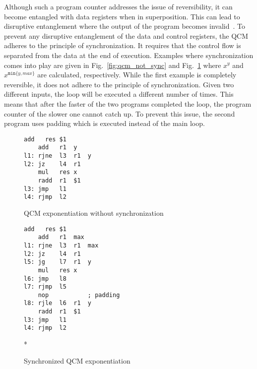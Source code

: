 Although such a program counter addresses the issue of reversibility, it can become entangled with data registers when in superposition. This can lead to disruptive entanglement where the output of the program becomes invalid~\cite{YVC24}. To prevent any disruptive entanglement of the data and control registers, the QCM adheres to the principle of synchronization. 
It requires that the control flow is separated from the data at the end of execution. 
Examples where synchronization comes into play are given in Fig.~\ref{fig:qcm_not_sync} and Fig.~\ref{fig:qcm_sync} where $x^y$ and $x^{\texttt{min}\{y, max\}}$ are calculated, respectively. 
While the first example is completely reversible, it does not adhere to the principle of synchronization. Given two different inputs, the loop will be executed a different number of times. This means that after the faster of the two programs completed the loop, the program counter of the slower one cannot catch up. To prevent this issue, the second program uses padding which is executed instead of the main loop. 

\begin{figure}[htp]
    \centering     
    \begin{minipage}{.40\textwidth}
        \vspace{7.5em}
        \begin{lstlisting}[linewidth=17em,style=QCM]
    add   res $1
    add   r1  y
l1: rjne  l3  r1  y
l2: jz    l4  r1
    mul   res x
    radd  r1  $1
l3: jmp   l1  
l4: rjmp  l2      
        \end{lstlisting}
        \caption{QCM exponentiation without synchronization}
        \label{fig:qcm_not_sync}
    \end{minipage}
    \hfill
    \begin{minipage}{.55\textwidth}
        \begin{lstlisting}[linewidth=23em,style=QCM]
    add   res $1
    add   r1  max
l1: rjne  l3  r1  max
l2: jz    l4  r1
l5: jg    l7  r1  y   
    mul   res x
l6: jmp   l8  
l7: rjmp  l5
    nop           ; padding
l8: rjle  l6  r1  y
    radd  r1  $1
l3: jmp   l1
l4: rjmp  l2
        \end{lstlisting}*
        \caption{Synchronized QCM exponentiation}    
        \label{fig:qcm_sync}
    \end{minipage}
\end{figure}


